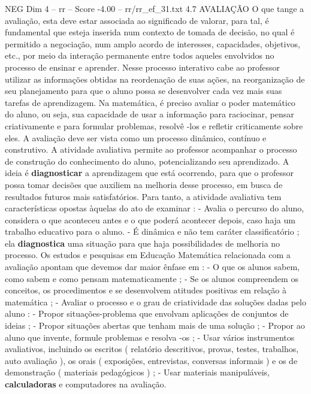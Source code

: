 \begin{textsample}{NEG Dim 4 – rr – Score -4.00 – rr/rr\_ef\_31.txt}  \label{ex:f4_neg_171}
4.7 AVALIAÇÃO O que tange a avaliação, esta deve estar associada ao significado de valorar, para tal, é fundamental que esteja inserida num contexto de tomada de decisão, no qual é permitido a negociação, num amplo acordo de interesses, capacidades, objetivos, etc., por meio da interação permanente entre todos aqueles envolvidos no processo de ensinar e aprender.
Nesse processo interativo cabe ao professor utilizar as informações obtidas na reordenação de suas ações, na reorganização de seu planejamento para que o aluno possa se desenvolver cada vez mais suas tarefas de aprendizagem.
Na matemática, é preciso avaliar o poder matemático do aluno, ou seja, sua capacidade de usar a informação para raciocinar, pensar criativamente e para formular problemas, resolvê -los e refletir criticamente sobre eles.
A avaliação deve ser vista como um processo dinâmico, contínuo e construtivo.
A atividade avaliativa permite ao professor acompanhar o processo de construção do conhecimento do aluno, potencializando seu aprendizado.
A ideia é \textbf{diagnosticar} a aprendizagem que está ocorrendo, para que o professor possa tomar decisões que auxiliem na melhoria desse processo, em busca de resultados futuros mais satisfatórios.
Para tanto, a atividade avaliativa tem características opostas àquelas do ato de examinar : - Avalia o percurso do aluno, considera o que aconteceu antes e o que poderá acontecer depois, caso haja um trabalho educativo para o aluno. - É dinâmica e não tem caráter classificatório ; ela \textbf{diagnostica} uma situação para que haja possibilidades de melhoria no processo.
Os estudos e pesquisas em Educação Matemática relacionada com a avaliação apontam que devemos dar maior ênfase em : - O que os alunos sabem, como sabem e como pensam matematicamente ; - Se os alunos compreendem os conceitos, os procedimentos e se desenvolvem atitudes positivas em relação à matemática ; - Avaliar o processo e o grau de criatividade das soluções dadas pelo aluno : - Propor situações-problema que envolvam aplicações de conjuntos de ideias ; - Propor situações abertas que tenham mais de uma solução ; - Propor ao aluno que invente, formule problemas e resolva -os ; - Usar vários instrumentos avaliativos, incluindo os escritos ( relatório descritivos, provas, testes, trabalhos, auto avaliação ), os orais ( exposições, entrevistas, conversas informais ) e os de demonstração ( materiais pedagógicos ) ; - Usar materiais manipuláveis, \textbf{calculadoras} e computadores na avaliação.

\end{textsample}
